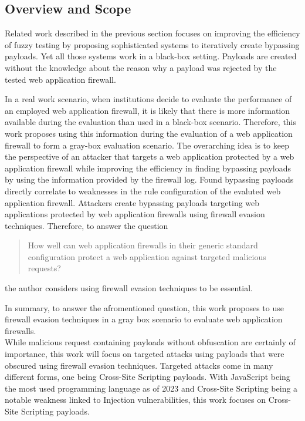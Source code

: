 \subsection{Overview and Scope}
Related work described in the previous section focuses on improving the efficiency of fuzzy testing by proposing sophisticated systems to iteratively create bypassing payloads. Yet all those systems work in a black-box setting. Payloads are created without the knowledge about the reason why a payload was rejected by the tested web application firewall.

In a real work scenario, when institutions decide to evaluate the performance of an employed web application firewall, it is likely that there is more information available during the evaluation than used in a black-box scenario. 
Therefore, this work proposes using this information during the evaluation of a web application firewall to form a gray-box evaluation scenario. 
The overarching idea is to keep the perspective of an attacker that targets a web application protected by a web application firewall while improving the efficiency in finding bypassing payloads by using the information provided by the firewall log. 
Found bypassing payloads directly correlate to weaknesses in the rule configuration of the evaluted web application firewall.
Attackers create bypassing payloads targeting web applications protected by web application firewalls using firewall evasion techniques. 
Therefore, to answer the question
\begin{quote}
How well can web application firewalls in their generic standard configuration
protect a web application against targeted malicious requests?
\end{quote}
the author considers using firewall evasion techniques to be essential.

In summary, to answer the afromentioned question, this work proposes to use firewall evasion techniques in a gray box scenario to evaluate web application firewalls. \\

While malicious request containing payloads without obfuscation are certainly of importance, this work will focus on targeted attacks using payloads that were obscured using firewall evasion techniques.
Targeted attacks come in many different forms, one being Cross-Site Scripting payloads.
With JavaScript being the most used programming language as of 2023 and Cross-Site Scripting being a notable weakness linked to Injection vulnerabilities, this work focuses on Cross-Site Scripting payloads. \cite{statista/mostusedlang,OWASP/Injection21}

